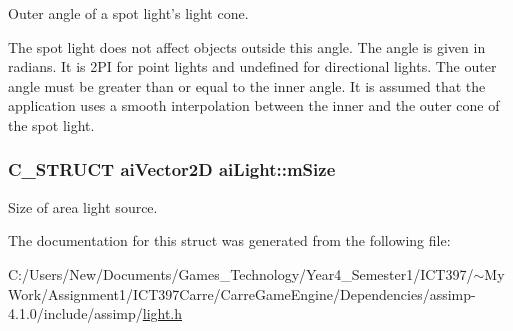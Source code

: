 Outer angle of a spot light's light cone.

The spot light does not affect objects outside this angle. The angle is given in radians. It is 2PI for point lights and undefined for directional lights. The outer angle must be greater than or equal to the inner angle. It is assumed that the application uses a smooth interpolation between the inner and the outer cone of the spot light. \hypertarget{structai_light_e2494aac85acce5e4fa3920b92b9d7b5}{
\subsubsection[mSize]{\setlength{\rightskip}{0pt plus 5cm}C\_\-STRUCT {\bf aiVector2D} {\bf aiLight::mSize}}}
\label{structai_light_e2494aac85acce5e4fa3920b92b9d7b5}


Size of area light source. 

The documentation for this struct was generated from the following file:\begin{CompactItemize}
\item 
C:/Users/New/Documents/Games\_\-Technology/Year4\_\-Semester1/ICT397/$\sim$My Work/Assignment1/ICT397Carre/CarreGameEngine/Dependencies/assimp-4.1.0/include/assimp/\hyperlink{light_8h}{light.h}\end{CompactItemize}
